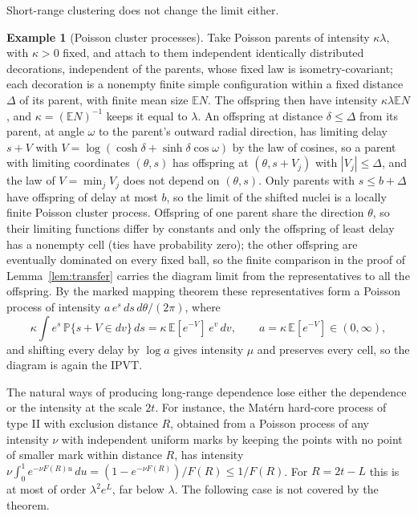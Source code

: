\documentclass[11pt]{amsart}
\theoremstyle{definition}
\newtheorem{example}[theorem]{Example}
\theoremstyle{remark}
\newcommand{\E}{\mathbb{E}}
\newcommand{\Prob}{\mathbb{P}}
\begin{document}
Short-range clustering does not change the limit either.

\begin{example}[Poisson cluster processes]
Take Poisson parents of intensity $\kappa\lambda$, with $\kappa>0$ fixed, and attach to them independent identically
distributed decorations, independent of the parents, whose fixed law is isometry-covariant; each decoration is a
nonempty finite simple configuration within a fixed distance $\Delta$ of its parent, with finite mean size $\E N$.
The offspring then have intensity $\kappa\lambda\E N$, and $\kappa=(\E N)^{-1}$ keeps it equal to $\lambda$. An offspring at distance
$\delta\le\Delta$ from its parent, at angle $\omega$ to the parent's outward radial direction, has limiting delay
$s+V$ with $V=\log(\cosh\delta+\sinh\delta\cos\omega)$ by the law of cosines, so a parent with limiting coordinates
$(\theta,s)$ has offspring at $(\theta,s+V_j)$ with $|V_j|\le\Delta$, and the law of $V=\min_jV_j$ does not depend on
$(\theta,s)$. Only parents with $s\le b+\Delta$ have offspring of delay at most $b$, so the limit of the shifted
nuclei is a locally finite Poisson cluster process. Offspring of one parent share the direction $\theta$, so their limiting functions differ by constants
and only the offspring of least delay has a nonempty cell (ties have probability zero); the other offspring are
eventually dominated on every fixed ball, so the finite comparison in the proof of Lemma~\ref{lem:transfer} carries the
diagram limit from the representatives to all the offspring. By the marked mapping theorem
these representatives form a Poisson process of intensity $a\,e^s\,ds\,d\theta/(2\pi)$, where
\[
  \kappa\int e^{s}\,\Prob\{s+V\in dv\}\,ds=\kappa\,\E[e^{-V}]\,e^{v}\,dv,\qquad a=\kappa\,\E[e^{-V}]\in(0,\infty),
\]
and shifting every delay by $\log a$ gives intensity $\mu$ and preserves every cell, so the diagram is again the IPVT.
\end{example}

The natural ways of producing long-range dependence lose either the dependence or the intensity at the scale
$2t$. For instance, the Mat\'ern hard-core process of type II with exclusion distance $R$, obtained from a Poisson process
of any intensity $\nu$ with independent uniform marks by keeping the points with no point of smaller mark within
distance $R$, has intensity $\nu\int_0^1e^{-\nu F(R)u}\,du=(1-e^{-\nu F(R)})/F(R)\le1/F(R)$. For $R=2t-L$ this is at most
of order $\lambda^2e^{L}$, far below $\lambda$. The
following case is not covered by the theorem.
\end{document}
